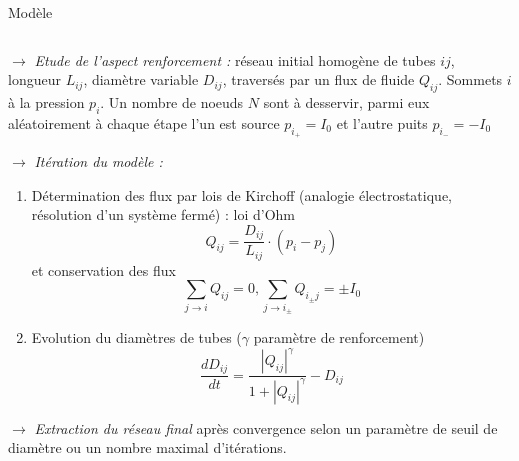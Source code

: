 \documentclass{beamer}
\begin{document}
\begin{frame}{}
\begin{columns}[t]
\begin{column}{.49\textwidth}
\begin{block}{Modèle}
\begin{columns}[t]
\begin{column}{.95\textwidth}
\begin{justify}
          \vspace{1.5cm}
                    
          $\rightarrow$ \textit{Etude de l'aspect renforcement :} réseau initial homogène de tubes $ij$, longueur $L_{ij}$, diamètre variable $D_{ij}$, traversés par un flux de fluide $Q_{ij}$. Sommets $i$ à la pression $p_i$. Un nombre de noeuds $N$ sont à desservir, parmi eux aléatoirement à chaque étape l'un est source $p_{i_+}=I_0$ et l'autre puits $p_{i_-}=-I_0$
          
          \vspace{1.5cm}
          
          
          $\rightarrow$ \textit{Itération du modèle :}
          \begin{enumerate}
          \item Détermination des flux par lois de Kirchoff (analogie électrostatique, résolution d'un système fermé) : loi d'Ohm
          \begin{equation}
Q_{ij}=\frac{D_{ij}}{L_{ij}}\cdot(p_{i}-p_{j})
\end{equation}
et conservation des flux
\begin{equation}
\sum_{j\rightarrow i}Q_{ij} = 0 , \sum_{j\rightarrow i_\pm}Q_{i_{\pm}j} = \pm I_0
\end{equation}



\item Evolution du diamètres de tubes ($\gamma$ paramètre de renforcement)
\begin{equation}
\frac{dD_{ij}}{dt}=\frac{\left|Q_{ij}\right|^{\gamma}}{1+\left|Q_{ij}\right|^{\gamma}}-D_{ij}
\end{equation}
          \end{enumerate}

\vspace{1.5cm}

$\rightarrow$ \textit{Extraction du réseau final} après convergence selon un paramètre de seuil de diamètre ou un nombre maximal d'itérations.


\end{justify}
          \end{column}
          \end{columns}
        \end{block}
        

\end{column}
\end{columns}
\end{frame}
\end{document}
